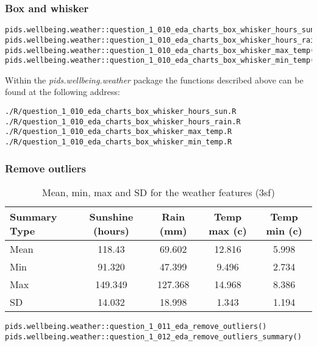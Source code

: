 \documentclass[12pt, oneside, openany]{book}
\begin{document}
\subsubsection*{Box and whisker}

\begin{verbatim}
pids.wellbeing.weather::question_1_010_eda_charts_box_whisker_hours_sun()
pids.wellbeing.weather::question_1_010_eda_charts_box_whisker_hours_rain()
pids.wellbeing.weather::question_1_010_eda_charts_box_whisker_max_temp()
pids.wellbeing.weather::question_1_010_eda_charts_box_whisker_min_temp()
\end{verbatim}

Within the \emph{pids.wellbeing.weather} package the functions described above can be found at the following address:

\begin{verbatim}
./R/question_1_010_eda_charts_box_whisker_hours_sun.R
./R/question_1_010_eda_charts_box_whisker_hours_rain.R
./R/question_1_010_eda_charts_box_whisker_max_temp.R
./R/question_1_010_eda_charts_box_whisker_min_temp.R
\end{verbatim}

\subsubsection*{Remove outliers}

\begin{table}[h!]
	\centering
	\begin{tabular}{ |l|c|c|c|c| }
		\hline
		Summary Type & Sunshine (hours) & Rain (mm) & Temp max (c) & Temp min (c)\\
		\hline
		\hline
		Mean & 118.43  & 69.602  & 12.816 & 5.998 \\
		Min & 91.320  & 47.399  & 9.496   & 2.734 \\
		Max & 149.349 & 127.368  & 14.968  & 8.386 \\
		SD & 14.032  & 18.998   & 1.343  & 1.194 \\
		\hline
	\end{tabular}
	\caption{Mean, min, max and SD for the weather features (3sf)}
	\label{table:question_1_008_grouped_data_summary_non_scaled}
\end{table}

\begin{verbatim}
pids.wellbeing.weather::question_1_011_eda_remove_outliers()
pids.wellbeing.weather::question_1_012_eda_remove_outliers_summary()
\end{verbatim}
\end{document}

